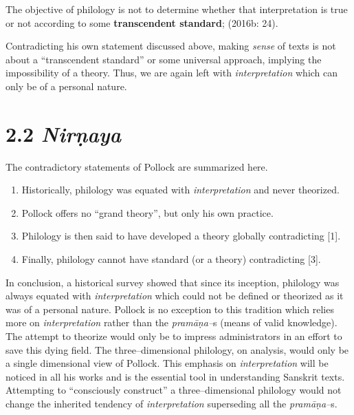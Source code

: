 \begin{myquote}
The objective of philology is not to determine whether that interpretation is true or not according to some \textbf{transcendent standard}; (2016b: 24).
\end{myquote}

Contradicting his own statement discussed above, making \textit{sense} of texts is not about a “transcendent standard” or some universal approach, implying the impossibility of a theory. Thus, we are again left with \textit{interpretation} which can only be of a personal nature.

\vspace{-.3cm}

\section*{2.2 {\it {\bfseries Nirṇaya}}}

The contradictory statements of Pollock are summarized here.

\begin{enumerate}
\itemsep=0pt
\item Historically, philology was equated with \textit{interpretation} and never theorized.

 \item Pollock offers no “grand theory”, but only his own practice.

 \item Philology is then said to have developed a theory globally contradicting [1].

 \item Finally, philology cannot have standard (or a theory) contradicting [3].

\end{enumerate}

In conclusion, a historical survey showed that since its inception, philology was always equated with \textit{interpretation} which could not be defined or theorized as it was of a personal nature. Pollock is no exception to this tradition which relies more on \textit{interpretation} rather than the \textit{pramāṇa–}s (means of valid knowledge). The attempt to theorize would only be to impress administrators in an effort to save this dying field. The three–dimensional philology, on analysis, would only be a single dimensional view of Pollock. This emphasis on \textit{interpretation} will be noticed in all his works and is the essential tool in understanding Sanskrit texts. Attempting to “consciously construct” a three–dimensional philology would not change the inherited tendency of \textit{interpretation} superseding all the \textit{pramāṇa–}s.

